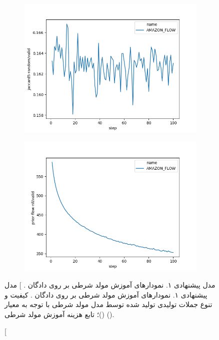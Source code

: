 \begin{figure}[h]
	\centering
	\begin{subfigure}{0.3\textheight}
		\centering
		\includegraphics[width=1.\textwidth]{images/figs2/2020_01_15__11_41_02__jaccard5-random.png}
		\caption{}
		\label{fig:chap4:amazon_flow_jaccard}
	\end{subfigure}
	\begin{subfigure}{0.3\textheight}
		\centering
		\includegraphics[width=1.\textwidth]{images/figs2/2020_01_15__11_41_01__prior-flow-nll.png}
		\caption{}
		\label{fig:chap4:amazon_flow_nll}
	\end{subfigure}
	\caption
	[
		مدل پیشنهادی ۱. نمودار‌های آموزش مولد شرطی بر روی دادگان \amazon{}.
	]
	{
		مدل پیشنهادی ۱. نمودار‌های آموزش مولد شرطی بر روی دادگان \amazon{}.
		کیفیت و تنوع جملات تولیدی تولید شده توسط مدل مولد شرطی با توجه به معیار \jaccard{}
		()؛
		تابع هزینه آموزش مولد شرطی
		().
	}
	\label{fig:chap4:amazon_flow}
\end{figure}

